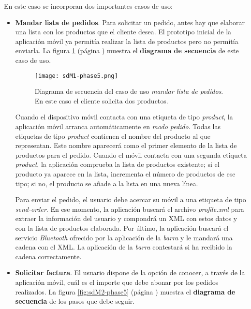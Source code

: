 En este caso se incorporan dos importantes casos de uso:
\begin{itemize}
\item \textbf{Mandar lista de pedidos}. Para solicitar un pedido, antes hay
que elaborar una lista con los productos que el cliente desea. El prototipo
inicial de la aplicación móvil ya permitía realizar la lista de productos
pero no permitía enviarla. La figura \ref{fig:sdM1-phase5} (página
\pageref{fig:sdM1-phase5}) muestra el \textbf{diagrama de secuencia} de este
caso de uso.

  \begin{figure}[!h]
    \begin{center}
      \texttt{[image: sdM1-phase5.png]}
      \caption{Diagrama de secuencia del caso de uso \emph{mandar lista
      de pedidos}. En este caso el cliente solicita dos productos.}
      \label{fig:sdM1-phase5}
    \end{center}
  \end{figure}

Cuando el dispositivo móvil contacta con una etiqueta de tipo \emph{product},
la aplicación móvil arranca automáticamente en \emph{modo pedido}. Todas las
etiquetas de tipo \emph{product} contienen el nombre del producto al que
representan. Este nombre aparecerá como el primer elemento de la lista de
productos para el pedido. Cuando el móvil contacta con una segunda etiqueta
\emph{product}, la aplicación comprueba la lista de productos existente; si
el producto ya aparece en la lista, incrementa el número de productos de ese
tipo; si no, el producto se añade a la lista en una nueva línea.

Para enviar el pedido, el usuario debe acercar su móvil a una etiqueta de
tipo \emph{send-order}. En ese momento, la aplicación buscará el archivo
\emph{profile.xml} para extraer la información del usuario y compondrá un
\acs{XML} con estos datos y con la lista de productos elaborada. Por último,
la aplicación buscará el servicio \emph{Bluetooth} ofrecido por la aplicación
de la \emph{barra} y le mandará una cadena con el \acs{XML}. La aplicación
de la \emph{barra} contestará si ha recibido la cadena correctamente.

\item \textbf{Solicitar factura}. El usuario dispone de la opción de conocer,
a través de la aplicación móvil, cuál es el importe que debe abonar por los
pedidos realizados. La figura \ref{fig:sdM2-phase5} (página
\pageref{fig:sdM2-phase5}) muestra el \textbf{diagrama de secuencia} de los
pasos que debe seguir.


\end{itemize}
